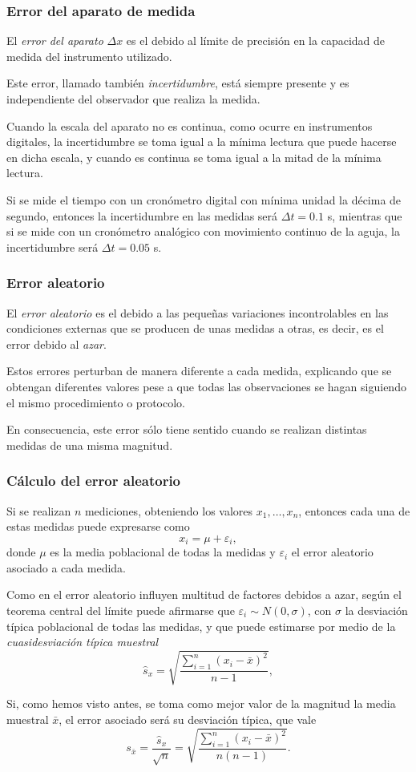 \begin{frame}
\frametitle{Error del aparato de medida }
El \emph{error del aparato} $\Delta x$ es el debido al límite de precisión en la capacidad de medida del instrumento
utilizado. 

Este error, llamado también \emph{incertidumbre}, está siempre presente y es independiente del observador
que realiza la medida.

Cuando la escala del aparato no es continua, como ocurre en instrumentos digitales, la incertidumbre se toma igual a la
mínima lectura que puede hacerse en dicha escala, y cuando es continua se toma igual a la mitad de la mínima lectura.

 Si se mide el tiempo con un cronómetro digital con mínima unidad la décima de segundo,
entonces la incertidumbre en las medidas será $\Delta t=0.1$ s, mientras que si se mide con un cronómetro analógico con
movimiento continuo de la aguja, la incertidumbre será $\Delta t=0.05$ s.
\end{frame}


\begin{frame}
\frametitle{Error aleatorio}
El \emph{error aleatorio} es el debido a las pequeñas variaciones incontrolables en las condiciones externas que se
producen de unas medidas a otras, es decir, es el error debido al \emph{azar}. 

Estos errores perturban de manera diferente a cada medida, explicando que se obtengan diferentes valores pese a que
todas las observaciones se hagan siguiendo el mismo procedimiento o protocolo.

En consecuencia, este error sólo tiene sentido cuando se realizan distintas medidas de una misma magnitud. 
\end{frame}


\begin{frame}
\frametitle{Cálculo del error aleatorio}
Si se realizan $n$ mediciones, obteniendo los valores $x_1,\ldots,x_n$, entonces cada una de estas medidas puede
expresarse como
\[
x_i = \mu + \varepsilon_i, 
\]
donde $\mu$ es la media poblacional de todas la medidas y $\varepsilon_i$ el error aleatorio asociado a cada medida.

Como en el error aleatorio influyen multitud de factores debidos a azar, según el teorema central del límite puede
afirmarse que $\varepsilon_i\sim N(0,\sigma)$, con $\sigma$ la desviación típica poblacional de todas las medidas, y que
puede estimarse por medio de la
\emph{cuasidesviación típica muestral}
\[
\hat{s}_x = \sqrt{\frac{\sum_{i=1}^n (x_i-\bar x)^2}{n-1}}, 
\]

Si, como hemos visto antes, se toma como mejor valor de la magnitud la media muestral $\bar x$, el error
asociado será su desviación típica, que vale
\[
s_{\bar x} = \frac{\hat{s}_x}{\sqrt n} = \sqrt{\frac{\sum_{i=1}^n (x_i-\bar x)^2}{n(n-1)}}.
\]
\end{frame}


